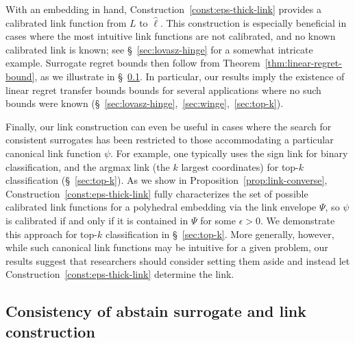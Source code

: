 \documentclass[twoside,11pt]{article}
\newcommand{\Comments}{1}
\newcommand{\mynote}[2]{\ifnum\Comments=1\textcolor{#1}{#2}\fi}
\newcommand{\raf}[1]{\mynote{darkgreen}{[RF: #1]}}
\begin{document}
With an embedding in hand, Construction~\ref{const:eps-thick-link} provides a calibrated link function from $L$ to $\hat\ell$.
This construction is especially beneficial in cases where the most intuitive link functions are not calibrated, and no known calibrated link is known; see \S~\ref{sec:lovasz-hinge} for a somewhat intricate example.
Surrogate regret bounds then follow from Theorem~\ref{thm:linear-regret-bound}, as we illustrate in \S~\ref{sec:abstain}.
In particular, our results imply the existence of linear regret transfer bounds bounds for several applications where no such bounds were known (\S~\ref{sec:lovasz-hinge},~\ref{sec:winge},~\ref{sec:top-k}).

Finally, our link construction can even be useful in cases where the search for consistent surrogates has been restricted to those accommodating a particular canonical link function $\psi$.
For example, one typically uses the sign link for binary classification, and the argmax link (the $k$ largest coordinates) for top-$k$ classification (\S~\ref{sec:top-k}).
As we show in Proposition~\ref{prop:link-converse}, Construction~\ref{const:eps-thick-link} fully characterizes the set of possible calibrated link functions for a polyhedral embedding via the link envelope $\Psi$, so $\psi$ is calibrated if and only if it is contained in $\Psi$ for some $\epsilon>0$.
We demonstrate this approach for top-$k$ classification in \S~\ref{sec:top-k}.
More generally, however, while such canonical link functions may be intuitive for a given problem, our results suggest that researchers should consider setting them aside and instead let Construction~\ref{const:eps-thick-link} determine the link.


\subsection{Consistency of abstain surrogate and link construction}
\label{sec:abstain}
\end{document}
